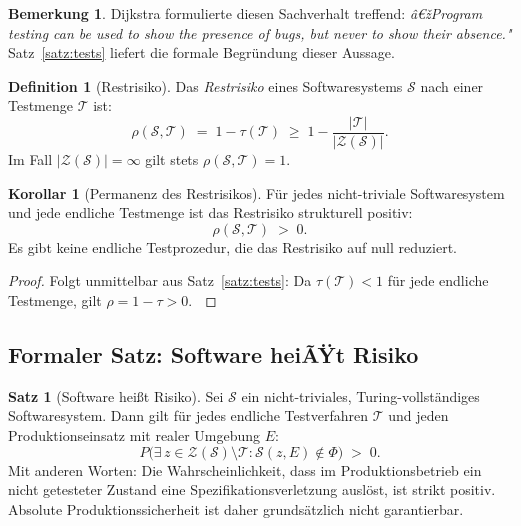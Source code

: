 ﻿\documentclass[a4paper,12pt]{article}
\theoremstyle{definition}
\newtheorem{definition}{Definition}
\newtheorem{satz}{Satz}
\newtheorem{bemerkung}{Bemerkung}
\newtheorem{korollar}{Korollar}
\newenvironment{beweis}{\begin{proof}}{\end{proof}}
\begin{document}
\begin{bemerkung}
    Dijkstra formulierte diesen Sachverhalt treffend: \emph{â€žProgram testing can be used
    to show the presence of bugs, but never to show their absence."} \cite{dijkstra1972}
    Satz~\ref{satz:tests} liefert die formale Begr\"undung dieser Aussage.
\end{bemerkung}

\begin{definition}[Restrisiko]
    Das \emph{Restrisiko} eines Softwaresystems $\mathcal{S}$ nach einer Testmenge
    $\mathcal{T}$ ist:
    \[
        \rho(\mathcal{S}, \mathcal{T}) \;=\; 1 - \tau(\mathcal{T}) \;\geq\; 1 - \frac{|\mathcal{T}|}{|\mathcal{Z}(\mathcal{S})|}.
    \]
    Im Fall $|\mathcal{Z}(\mathcal{S})| = \infty$ gilt stets $\rho(\mathcal{S}, \mathcal{T}) = 1$.
\end{definition}

\begin{korollar}[Permanenz des Restrisikos]
\label{kor:restrisiko}
    F\"ur jedes nicht-triviale Softwaresystem und jede endliche Testmenge ist das Restrisiko
    strukturell positiv:
    \[
        \rho(\mathcal{S}, \mathcal{T}) \;>\; 0.
    \]
    Es gibt keine endliche Testprozedur, die das Restrisiko auf null reduziert.
\end{korollar}

\begin{beweis}
    Folgt unmittelbar aus Satz~\ref{satz:tests}: Da $\tau(\mathcal{T}) < 1$ f\"ur jede
    endliche Testmenge, gilt $\rho = 1 - \tau > 0$. $\qedhere$
\end{beweis}

\subsection{Formaler Satz: Software heiÃŸt Risiko}

\begin{satz}[Software hei\ss{}t Risiko]
\label{satz:risiko}
    Sei $\mathcal{S}$ ein nicht-triviales, Turing-vollst\"andiges Softwaresystem.
    Dann gilt f\"ur jedes endliche Testverfahren $\mathcal{T}$ und jeden
    Produktionseinsatz mit realer Umgebung $E$:
    \[
        P\bigl(\exists\, z \in \mathcal{Z}(\mathcal{S}) \setminus \mathcal{T} \colon
        \mathcal{S}(z, E) \notin \Phi\bigr) \;>\; 0.
    \]
    Mit anderen Worten: Die Wahrscheinlichkeit, dass im Produktionsbetrieb ein nicht
    getesteter Zustand eine Spezifikationsverletzung ausl\"ost, ist strikt positiv.
    Absolute Produktionssicherheit ist daher grunds\"atzlich nicht garantierbar.
\end{satz}
\end{document}
